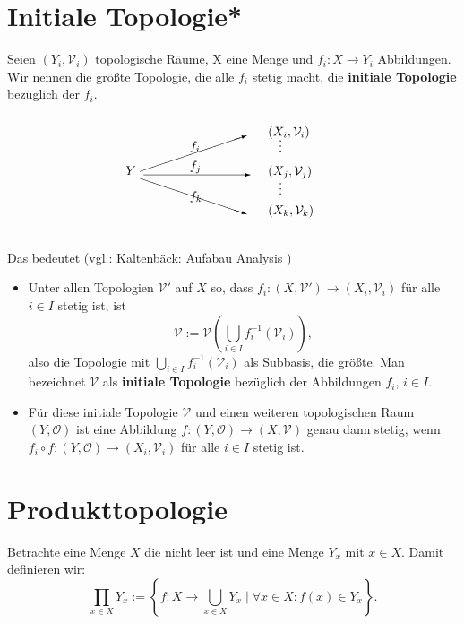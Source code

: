 \section{Initiale Topologie*}

Seien $(Y_i, \mathcal{V}_i)$ topologische Räume, X eine Menge
und $f_i : X \to Y_i$ Abbildungen.
Wir nennen die  größte Topologie, die alle $f_i$ stetig macht, 
die \textbf{initiale Topologie} bezüglich der $f_i$.
$$
\setlength{\unitlength}{1cm}
\begin{picture}(6,3.5)
  \put(0,1.7){$Y$}

  \put(0.4,1.8){\vector(3,1){3}}
  \put(0.5,1.7){\vector(1,0){3}}
  \put(0.4,1.6){\vector(3,-1){3}}

  \put(4,2.8){$(X_i, \mathcal{V}_i)$}
  \put(4,1.7){$(X_j, \mathcal{V}_j)$}
  \put(4,0.6){$(X_k, \mathcal{V}_k)$}

  \put(1.8,2.4){$f_i$}
  \put(1.8,1.85){$f_j$}
  \put(1.8,1.0){$f_k$}

  \put(4.3,2.35){$\vdots$}
  \put(4.3,1.15){$\vdots$}
\end{picture}
$$

Das bedeutet (vgl.: Kaltenbäck: Aufabau Analysis ) 
\begin{itemize}
    \item Unter allen Topologien $\mathcal{V}'$ auf $X$ so, dass 
    $f_i : (X, \mathcal{V}') \to (X_i, \mathcal{V}_i)$ für alle $i \in I$
    stetig ist, ist 
    $$
    \mathcal{V} := \mathcal{V}\!\left( \bigcup_{i \in I} f_i^{-1}(\mathcal{V}_i) 
    \right),
    $$
    also die Topologie mit $\bigcup_{i \in I} f_i^{-1}(\mathcal{V}_i)$ 
    als Subbasis, die größte.  
    Man bezeichnet $\mathcal{V}$ als \textbf{initiale Topologie} 
    bezüglich der Abbildungen $f_i$, $i \in I$.

    \item Für diese initiale Topologie $\mathcal{V}$ 
    und einen weiteren topologischen Raum $(Y, \mathcal{O})$ 
    ist eine Abbildung $f : (Y, \mathcal{O}) \to (X, \mathcal{V})$ 
    genau dann stetig, 
    wenn $f_i \circ f : (Y, \mathcal{O}) \to (X_i, \mathcal{V}_i)$ 
    für alle $i \in I$ stetig ist.
\end{itemize}

\section{Produkttopologie}


Betrachte eine Menge $X$ die nicht leer ist und eine Menge 
$Y_x$ mit $x \in X$. Damit definieren wir:
$$
\prod_{x \in X} Y_x := \left\{ f : X \to \bigcup_{x \in X} Y_x 
\mid \forall x \in X : f(x) \in Y_x \right\}.
$$

